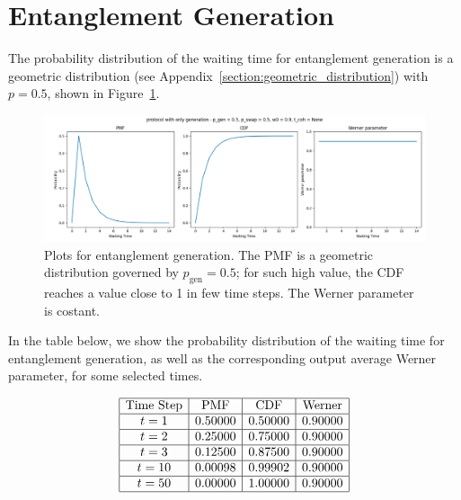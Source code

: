\documentclass{masterthesis}
\begin{document}
\section{Entanglement Generation}\label{section:entanglement_generation_numerical_example}

The probability distribution of the waiting time for entanglement generation is a geometric distribution (see Appendix~\ref{section:geometric_distribution}) with $p = 0.5$, shown in Figure~\ref{fig:gen_waiting_time}.
\begin{figure}[ht]
    \centering
    \includegraphics[width=1\linewidth]{images/dist_tests/only generation.png}
    \caption{Plots for entanglement generation. The PMF is a geometric distribution governed by $p_\text{gen} = 0.5$; for such high value, the CDF reaches a value close to 1 in few time steps. The Werner parameter is costant.}
    \label{fig:gen_waiting_time}
\end{figure}

In the table below, we show the probability distribution of the waiting time for entanglement generation, as well as the corresponding output average Werner parameter, for some selected times.

\begin{equation*}
    \begin{array}{|c|c|c|c|}
        \hline
        \text{Time Step} & \text{PMF} & \text{CDF} & \text{Werner} \\
        \hline
        t = 1 & 0.50000 & 0.50000 & 0.90000 \\
        \hline
        t = 2 & 0.25000 & 0.75000 & 0.90000 \\
        \hline
        t = 3 & 0.12500 & 0.87500 & 0.90000 \\
        \hline
        t = 10 & 0.00098 & 0.99902 & 0.90000 \\
        \hline
        t = 50 & 0.00000 & 1.00000 & 0.90000 \\
        \hline
    \end{array}
    \label{tab:gen_waiting_time}
\end{equation*}
\end{document}
